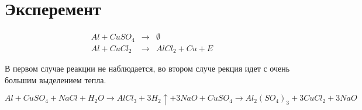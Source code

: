 \section{Эксперемент}

\begin{eqnarray}
    Al + CuSO_4 &\to& \emptyset \\  
    Al + CuCl_2 &\to& AlCl_2  + Cu  + E
\end{eqnarray}

В первом случае реакции не наблюдается, во втором случе рекция идет 
с очень большим выделением тепла.

\begin{equation}
    Al + CuSO_4 + NaCl + H_2O \to 
    AlCl_3 + 3H_2\uparrow + 3NaO + CuSO_4 \to  
    Al_2(SO_4)_3 + 3CuCl_2 + 3NaO
\end{equation}








